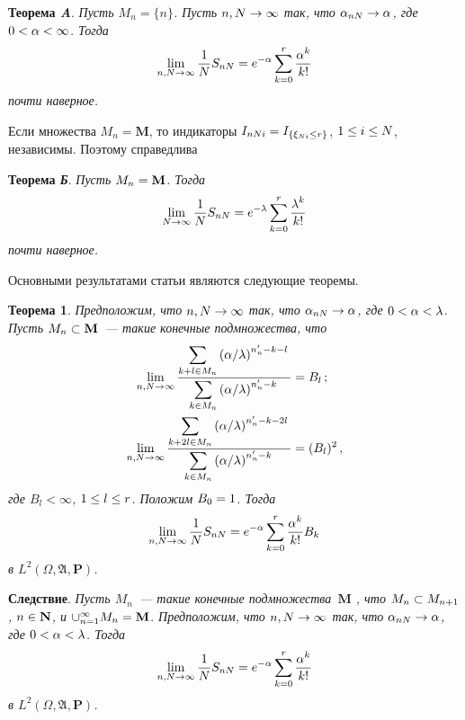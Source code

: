 \begin{multicols}{2}
\medskip

\noindent
\textbf{Теорема \emph{A}}. \textit{Пусть $M_n=\{n\}$. Пусть $n,
N\hm\to\infty$ так, что $\alpha_{nN}\hm\to\alpha$, где $0\hm<\alpha\hm<\infty$.
Тогда
$$
\lim\limits_{n, N\to\infty}\displaystyle\frac{\displaystyle 1\mathstrut}{\displaystyle N\mathstrut}S_{nN}=e^{-\alpha}\sum\limits_{k=0}^r\displaystyle\frac{\displaystyle \alpha^k\mathstrut}{\displaystyle k!\mathstrut}
$$
почти наверное.}

\pagebreak


Если множества $M_n=\mathbf{M}$, то индикаторы
$I_{nNi}=I_{\{\xi_{Ni}\hm\le r\}}$, $1\hm\le i\hm\le N$, независимы. Поэтому
справедлива

\medskip

\noindent
\textbf{Теорема \emph{Б}}. \textit{Пусть $M_n\hm=\mathbf{M}$.  Тогда
$$
\lim\limits_{N\to\infty}\displaystyle\frac{\displaystyle 1\mathstrut}{\displaystyle N\mathstrut}S_{nN}=e^{-\lambda}\sum\limits_{k=0}^r\displaystyle\frac{\displaystyle \lambda^k\mathstrut}{\displaystyle k!\mathstrut}
$$
почти наверное.}

\medskip

Основными результатами статьи являются следующие теоремы.

\medskip

\noindent
\textbf{Теорема 1}. \textit{Предположим,  что $n, N\hm\to\infty$ так, что
$\alpha_{nN}\hm\to\alpha$, где $0\hm<\alpha\hm<\lambda$. Пусть $M_n\hm\subset
\mathbf{M}$~--- такие конечные подмножества, что
\begin{align}
\lim_{n, N\to\infty}\displaystyle\frac{\displaystyle \sum\limits_{k+l\in
M_n}\left({\alpha}/{\lambda}\right)^{n'_n-k-l}\mathstrut}{\displaystyle \sum\limits_{k\in
M_n}\left({\alpha}/{\lambda}\right)^{n'_n-k}\mathstrut}&=B_l \,;
\label{e1-chu}\\
\lim_{n, N\to\infty}\displaystyle\frac{\displaystyle \sum\limits_{k+2l\in
M_n}\left({\alpha}/{\lambda}\right)^{n'_n-k-2l}\mathstrut}{\displaystyle \sum\limits_{k\in
M_n}\left({\alpha}/{\lambda}\right)^{n'_n-k}\mathstrut}&=(B_l)^2\,,
\label{e2-chu}
\end{align}
где $B_l<\infty$, $1\hm\le l\hm\le r$. Положим $B_0\hm=1$.  Тогда
\begin{equation}
\lim_{n, N\to\infty}\displaystyle\frac{\displaystyle 1\mathstrut}{\displaystyle N\mathstrut}S_{nN}=e^{-\alpha}\sum\limits_{k=0}^r\displaystyle\frac{\displaystyle \alpha^k\mathstrut}{\displaystyle k!\mathstrut}B_k
\label{e3-chu}
\end{equation}
в $L^2(\Omega, \mathfrak{A}, \mathbf{P})$.}


\medskip

\noindent
\textbf{Следствие}. \textit{Пусть $M_n$~--- такие конечные подмножества~$\mathbf{M}$ , 
что $M_n\hm\subset M_{n+1}$, $n\hm\in \mathbf{N}$, и
$\cup_{n=1}^{\infty}M_n \hm=\mathbf{M}$. Предположим, что $n, N\hm\to\infty$
так, что $\alpha_{nN}\hm\to\alpha$, где $0\hm<\alpha\hm<\lambda$.  Тогда
$$
\lim_{n,N\to\infty}\displaystyle\frac{\displaystyle 1\mathstrut}{\displaystyle N\mathstrut}S_{nN}=e^{-\alpha}\sum\limits_{k=0}^r\displaystyle\frac{\displaystyle \alpha^k\mathstrut}{\displaystyle k!\mathstrut}
$$
в $L^2(\Omega, \mathfrak{A}, \mathbf{P})$.}



\end{multicols}

